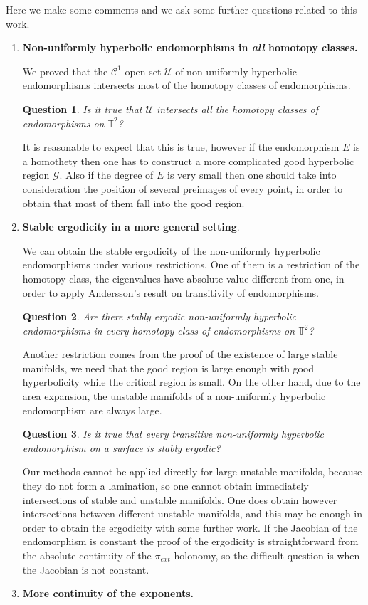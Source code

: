 \documentclass[11pt,letterpaper,reqno]{article}
\newtheorem{question}{Question}
\newcommand{\TT}{\mathbb{T}^2}
\begin{document}
Here we make some comments and we ask some further questions related to this work.
\begin{enumerate}
\item {\bf Non-uniformly hyperbolic endomorphisms in {\it all} homotopy classes.}

We proved that the $\mathcal{C}^1$ open set $\mathcal U$ of non-uniformly hyperbolic endomorphisms intersects most of the homotopy classes of endomorphisms.
\begin{question}
Is it true that $\mathcal U$ intersects all the homotopy classes of endomorphisms on $\TT$?
\end{question}
It is reasonable to expect that this is true, however if the endomorphism $E$ is a homothety then one has to construct a more complicated good hyperbolic region $\mathcal G$. Also if the degree of $E$ is very small then one should take into consideration the position of several preimages of every point, in order to obtain that most of them fall into the good region.

\item {\bf Stable ergodicity in a more general setting}.

We can obtain the stable ergodicity of the non-uniformly hyperbolic endomorphisms under various restrictions. One of them is a restriction of the homotopy class, the eigenvalues have absolute value different from one, in order to apply Andersson's result on transitivity of endomorphisms.
\begin{question}
Are there stably ergodic non-uniformly hyperbolic endomorphisms in every homotopy class of endomorphisms on $\TT$?
\end{question}
Another restriction comes from the proof of the existence of large stable manifolds, we need that the good region is large enough with good hyperbolicity while the critical region is small. On the other hand, due to the area expansion, the unstable manifolds of a non-uniformly hyperbolic endomorphism are always large.
\begin{question}
Is it true that every transitive non-uniformly hyperbolic endomorphism on a surface is stably ergodic?
\end{question}
Our methods cannot be applied directly for large unstable manifolds, because they do not form a lamination, so one cannot obtain immediately intersections of stable and unstable manifolds. One does obtain however intersections between different unstable manifolds, and this may be enough in order to obtain the ergodicity with some further work.
If the Jacobian of the endomorphism is constant the proof of the ergodicity is straightforward from the absolute continuity of the $\pi_{ext}$ holonomy, so the difficult question is when the Jacobian is not constant.
\item {\bf More continuity of the exponents.}


\end{enumerate}
\end{document}
